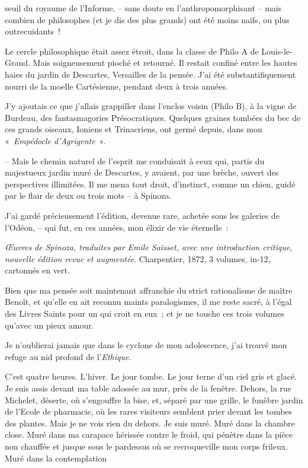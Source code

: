 \quebra

\noindent{}seuil du royaume de
l'Informe, -- sans doute en l'anthropomorphisant -- mais combien de
philosophes (et je dis des plus grands) ont été moins naïfs, ou plus
outrecuidants~!

Le cercle philosophique était assez étroit, dans la classe de Philo A de
Louis-le-Grand. Mais soigneusement pioché et retourné. Il restait
confiné entre les hautes haies du jardin de Descartes, Versailles de la
pensée. J'ai été substantifiquement nourri de la moelle Cartésienne,
pendant deux à trois années.

J'y ajoutais ce que j'allais grappiller dans l'enclos voisin (Philo B),
à la vigne de Burdeau, des fantasmagories Présocratiques. Quelques
graines tombées du bec de ces grands oiseaux, Ioniens et Trinacriens,
ont germé depuis, dans mon «~\emph{Empédocle d'Agrigente}~».

-- Mais le chemin naturel de l'esprit me conduisait à ceux qui, partis
du majestueux jardin muré de Descartes, y avaient, par une brèche,
ouvert des perspectives illimitées. Il me mena tout droit, d'instinct,
comme un chien, guidé par le flair de deux ou trois mots -- à Spinoza.

J'ai gardé précieusement l'édition, devenue rare, achetée sous les
galeries de l'Odéon, -- qui fut, en ces années, mon élixir de vie
éternelle~:

\emph{\OE uvres de Spinoza, traduites par Emile Saisset, avec une
introduction critique, nouvelle édition revue et augmentée}.
Charpentier, 1872, 3 volumes, in-12, cartonnés en vert.

Bien que ma pensée soit maintenant affranchie du strict rationalisme de
maître Benoît, et qu'elle en ait reconnu maints paralogismes, il me
reste sacré, à l'égal des Livres Saints pour un qui croit en eux~; et je
ne touche ces trois volumes qu'avec un pieux amour.

Je n'oublierai jamais que dans le cyclone de mon adolescence, j'ai
trouvé mon refuge au nid profond de l'\emph{Ethique}.

C'est quatre heures. L'hiver. Le jour tombe. Le jour terne d'un ciel
gris et glacé. Je suis assis devant ma table adossée au mur, près de la
fenêtre. Dehors, la rue Michelet, déserte, où s'engouffre la bise, et,
séparé par une grille, le funèbre jardin de l'Ecole de pharmacie, où les
rares visiteurs semblent prier devant les tombes des plantes.
Mais je ne vois rien du dehors. Je suis muré. Muré
dans la chambre close. Muré dans ma carapace hérissée contre le froid,
qui pénètre dans la pièce non chauffée et jusque sous le pardessus où se
recroqueville mon corps frileux. Muré dans la contemplation \linebreak

